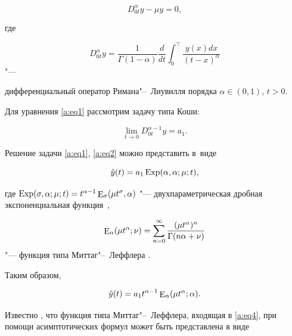 \begin{equation}

\label{a:eq1}

D_{0t}^{\alpha}y-\mu y=0, 

\end{equation}

где 

$$ D_{0t}^{\alpha}y=\dfrac{1}{\Gamma\left(1-\alpha\right)}\dfrac{d}{dt}\int_{0}^\top \frac{y (x) dx}{(t-x)^{\alpha}} $$ "---

дифференциальный оператор Римана"--~Лиувилля порядка $\alpha \in (0, 1)$, $t>0$.

Для уравнения \eqref{a:eq1} рассмотрим задачу типа Коши:

\begin{equation}

\label{a:eq2}

\lim_{t \to 0}{D_{0t}^{\alpha-1}y}=a_1.

\end{equation}



Решение задачи \eqref{a:eq1}, \eqref{a:eq2} можно представить \cite{a:O} в~виде 

\begin{equation}

\label{a:eq3}

\tilde{y}(t)=a_1 \mathop{\rm Exp}(\alpha,\alpha;\mu;t ) , 

\end{equation}	

где $\mathop{\rm Exp}(\sigma, \alpha; \mu; t)=t^{\alpha-1}\mathop{\rm E}\nolimits_{\sigma}(\mu t^{\sigma},\alpha)$ "--- двухпараметрическая дробная экспоненциальная функция~\cite{a:O2}, 

$$\mathop{\rm E}\nolimits_{\alpha}(\mu t^{\alpha};\nu)=\sum_{n=0}^{\infty} \dfrac{(\mu t^{\alpha})^{n}}{\Gamma(n\alpha+\nu)}$$ "--- функция типа Миттаг"--~Леффлера \cite{a:D}.

Таким образом,

\begin{equation}\label{a:eq4}

\tilde{y}(t)=a_1 t^{\alpha-1} \mathop{\rm E}\nolimits_{\alpha}(\mu t^{\alpha};\alpha). 

\end{equation}



Известно \cite{a:D}, что функция типа Миттаг"--~Леффлера, входящая в \eqref{a:eq4}, при помощи асимптотических формул может быть представлена в виде

